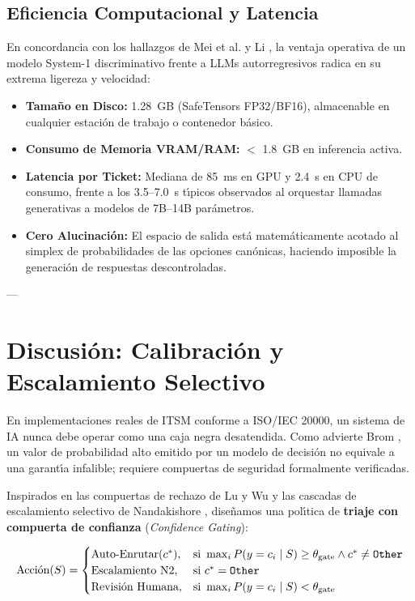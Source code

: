 \documentclass[10pt,journal,compsoc]{IEEEtran}
\begin{document}
\subsection{Eficiencia Computacional y Latencia}
En concordancia con los hallazgos de Mei et al. \cite{mei2026satops} y Li \cite{li2026fast}, la ventaja operativa de un modelo System-1 discriminativo frente a LLMs autorregresivos radica en su extrema ligereza y velocidad:
\begin{itemize}
    \item \textbf{Tama\~no en Disco:} 1.28~GB (SafeTensors FP32/BF16), almacenable en cualquier estaci\'on de trabajo o contenedor b\'asico.
    \item \textbf{Consumo de Memoria VRAM/RAM:} $<$ 1.8~GB en inferencia activa.
    \item \textbf{Latencia por Ticket:} Mediana de 85~ms en GPU y 2.4~s en CPU de consumo, frente a los 3.5--7.0~s t\'{\i}picos observados al orquestar llamadas generativas a modelos de 7B--14B par\'ametros.
    \item \textbf{Cero Alucinaci\'on:} El espacio de salida est\'a matem\'aticamente acotado al simplex de probabilidades de las opciones can\'onicas, haciendo imposible la generaci\'on de respuestas descontroladas.
\end{itemize}

---

\section{Discusi\'on: Calibraci\'on y Escalamiento Selectivo}

En implementaciones reales de ITSM conforme a ISO/IEC 20000, un sistema de IA nunca debe operar como una caja negra desatendida. Como advierte Brom \cite{brom2026confidence}, un valor de probabilidad alto emitido por un modelo de decisi\'on no equivale a una garant\'{\i}a infalible; requiere compuertas de seguridad formalmente verificadas.

Inspirados en las compuertas de rechazo de Lu y Wu \cite{lu2026benchmarking} y las cascadas de escalamiento selectivo de Nandakishore \cite{nandakishore2026laya}, dise\~namos una pol\'{\i}tica de \textbf{triaje con compuerta de confianza} (\emph{Confidence Gating}):

\begin{equation}
\text{Acci\'on}(S) = 
\begin{cases} 
\text{Auto-Enrutar}(c^*), & \text{si } \max_{i} P(y=c_i \mid S) \ge \theta_{\text{gate}} \land c^* \ne \text{\texttt{Other}} \\
\text{Escalamiento N2}, & \text{si } c^* = \text{\texttt{Other}} \\
\text{Revisi\'on Humana}, & \text{si } \max_{i} P(y=c_i \mid S) < \theta_{\text{gate}}
\end{cases}
\end{equation}
\end{document}
